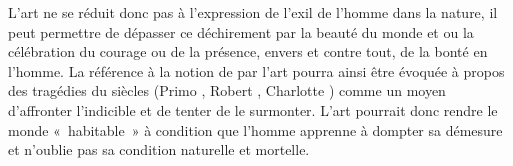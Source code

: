 {L'art ne se réduit donc pas à l'expression de l'exil de l'homme dans la nature, il peut
permettre de dépasser ce déchirement par la beauté du monde et ou la célébration du courage ou
de la présence, envers et contre tout, de la bonté en l'homme. La référence à la notion de
 par l'art pourra ainsi être évoquée à propos des tragédies du siècles (Primo ,
Robert , Charlotte ) comme un moyen d'affronter l'indicible et de tenter de le
surmonter. L'art pourrait donc rendre le monde «~habitable~» à condition que l'homme apprenne à
dompter sa démesure et n'oublie pas sa condition naturelle et mortelle.}


